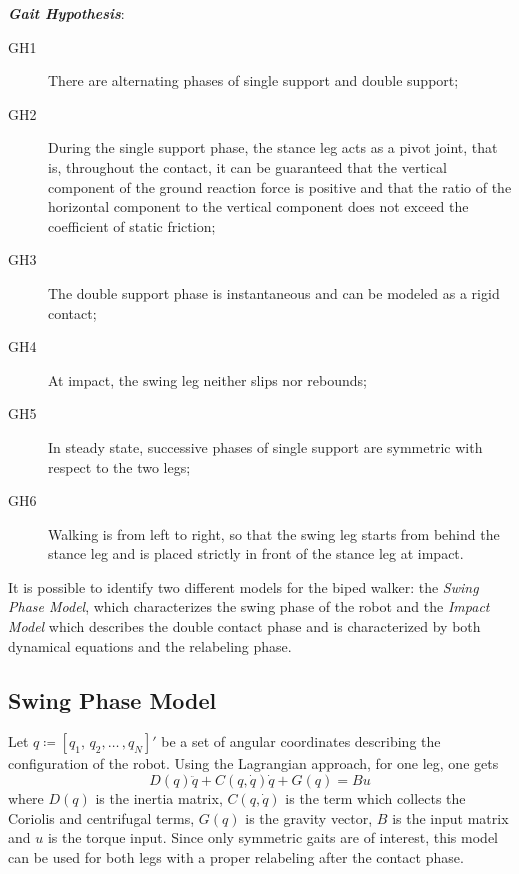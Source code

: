 \documentclass[11pt]{article}
\begin{document}
\textit{\textbf{Gait Hypothesis}}:

\begin{description}
\item[GH1] There are alternating phases of single support and double support;
\item[GH2] During the single support phase, the stance leg acts as a pivot joint, that is, throughout the contact, it can be guaranteed that the vertical component of the ground reaction force is positive and that the ratio of the horizontal component to the vertical component does not exceed the coefficient of static friction;
\item[GH3] The double support phase is instantaneous and can be modeled as a rigid contact;
\item[GH4] At impact, the swing leg neither slips nor rebounds;
\item[GH5] In steady state, successive phases of single support are symmetric with respect to the two legs;
\item[GH6] Walking is from left to right, so that the swing leg starts from behind the stance leg and is placed strictly in front of the stance leg at impact.
\end{description}

It is possible to identify two different models for the biped walker: the \textit{Swing Phase Model}, which characterizes the swing phase of the robot and the \textit{Impact Model} which describes the double contact phase and is characterized by both dynamical equations and the relabeling phase.

\subsection{Swing Phase Model}

Let $q \coloneqq [q_1,\, q_2, \ldots \, ,q_N]'$ be a set of angular coordinates describing the configuration of the robot. Using the Lagrangian approach, for one leg, one gets 
\begin{equation}
D(q)\ddot{q} + C(q,\dot{q})\dot{q} + G(q) = Bu
\end{equation}
where $D(q)$ is the inertia matrix, $C(q,\dot{q})$ is the term which collects the Coriolis and centrifugal terms, $G(q)$ is the gravity vector, $B$ is the input matrix and $u$ is the torque input. Since only symmetric gaits are of interest, this model can be used for both legs with a proper relabeling after the contact phase.
\end{document}
